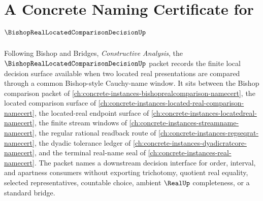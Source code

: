 \chapter{A Concrete Naming Certificate for $\BishopRealLocatedComparisonDecisionUp$}
\label{ch:concrete-instances-bishop-real-located-comparison-decision-namecert}

Following Bishop and Bridges, \emph{Constructive Analysis}, the $\BishopRealLocatedComparisonDecisionUp$ packet records the finite local decision surface available when two located real presentations are compared through a common Bishop-style Cauchy-name window. It sits between the Bishop comparison packet of \autoref{ch:concrete-instances-bishoprealcomparison-namecert}, the located comparison surface of \autoref{ch:concrete-instances-located-real-comparison-namecert}, the located-real endpoint surface of \autoref{ch:concrete-instances-locatedreal-namecert}, the finite stream windows of \autoref{ch:concrete-instances-streamname-namecert}, the regular rational readback route of \autoref{ch:concrete-instances-regseqrat-namecert}, the dyadic tolerance ledger of \autoref{ch:concrete-instances-dyadicratcore-namecert}, and the terminal real-name seal of \autoref{ch:concrete-instances-real-namecert}. The packet names a downstream decision interface for order, interval, and apartness consumers without exporting trichotomy, quotient real equality, selected representatives, countable choice, ambient $\RealUp$ completeness, or a standard bridge.

